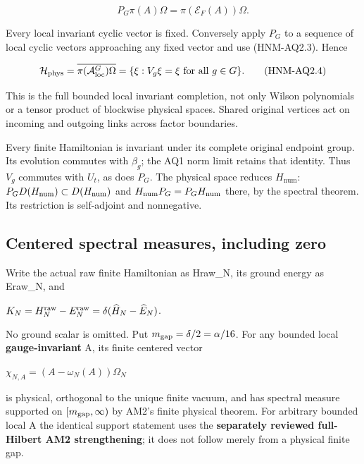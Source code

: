 \begin{equation}
P_G\pi(A)\Omega=\pi(\mathcal E_F(A))\Omega.\tag{HNM-AQ2.3}
\label{r29:aq2:eq3}
\end{equation}

Every local invariant cyclic vector is fixed. Conversely apply \(P_G\) to a sequence of local cyclic vectors approaching any fixed vector and use (HNM-AQ2.3). Hence

\begin{equation}
\mathcal H_{\rm phys}=\overline{\pi(\mathcal A_{\rm loc}^{G})\Omega}
=\{\xi:V_g\xi=\xi\text{ for all }g\in G\}.\tag{HNM-AQ2.4}
\label{r29:aq2:eq4}
\end{equation}

This is the full bounded local invariant completion, not only Wilson polynomials or a tensor product of blockwise physical spaces. Shared original vertices act on incoming and outgoing links across factor boundaries.

Every finite Hamiltonian is invariant under its complete original endpoint group. Its evolution commutes with \(\beta_g\); the AQ1 norm limit retains that identity. Thus \(V_g\) commutes with \(U_t\), as does \(P_G\). The physical space reduces \(H_{\mathrm{num}}\): \(P_GD(H_{\rm num})\subset D(H_{\rm num})\) and \(H_{\rm num}P_G=P_GH_{\rm num}\) there, by the spectral theorem. Its restriction is self-adjoint and nonnegative.

\hypertarget{r29-aq2-centered-spectral-measures-including-zero}{%
\subsection{Centered spectral measures, including zero}\label{r29:aq2:r29-aq2-centered-spectral-measures-including-zero}}

Write the actual raw finite Hamiltonian as Hraw\_N, its ground energy as Eraw\_N, and

\(K_N=H_N^{\rm raw}-E_N^{\rm raw}=\delta(\widehat H_N-\widehat E_N)\).

No ground scalar is omitted. Put \(m_{\rm gap}=\delta/2=\alpha/16\). For any bounded local \textbf{gauge-invariant} A, its finite centered vector

\(\chi_{N,A}=(A-\omega_N(A))\Omega_N\)

is physical, orthogonal to the unique finite vacuum, and has spectral measure supported on \([m_{\rm gap},\infty)\) by AM2's finite physical theorem. For arbitrary bounded local A the identical support statement uses the \textbf{separately reviewed full-Hilbert AM2 strengthening}; it does not follow merely from a physical finite gap.

